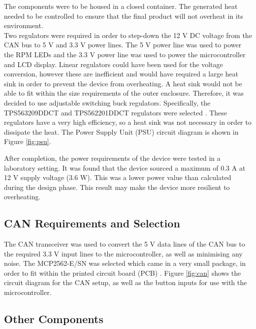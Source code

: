 \documentclass[a4paper,12pt]{article}
\begin{document}
The components were to be housed in a closed container. The generated heat needed to be controlled to ensure that the final product will not overheat in its environment. \\
 
Two regulators were required in order to step-down the 12 V DC voltage from the CAN bus to 5 V and 3.3 V power lines. The 5 V power line was used to power the RPM LEDs and the 3.3 V power line was used to power the microcontroller and LCD display. Linear regulators could have been used for the voltage conversion, however these are inefficient and would have required a large heat sink in order to prevent the device from overheating. A heat sink would not be able to fit within the size requirements of the outer enclosure. Therefore, it was decided to use adjustable switching buck regulators. Specifically, the TPS563209DDCT and TPS562201DDCT regulators were selected \cite{psu_1, psu_2}. These regulators have a very high efficiency, so a heat sink was not necessary in order to dissipate the heat. The Power Supply Unit (PSU) circuit diagram is shown in Figure \ref{fig:psu}.


 
After completion, the power requirements of the device were tested in a laboratory setting. It was found that the device sourced a maximum of 0.3 A at 12 V supply voltage (3.6 W). This was a lower power value than calculated during the design phase. This result may make the device more resilient to overheating.

\newpage
\subsection{CAN Requirements and Selection}
\label{sec:CAN}

The CAN transceiver was used to convert the 5 V data lines of the CAN bus to the required 3.3 V input lines to the microcontroller, as well as minimising any noise. The MCP2562-E/SN was selected which came in a very small package, in order to fit within the printed circuit board (PCB) \cite{can_transciever}. Figure \ref{fig:can} shows the circuit diagram for the CAN setup, as well as the button inputs for use with the microcontroller. 



\subsection{Other Components}
\label{sec:other_components}
\end{document}
